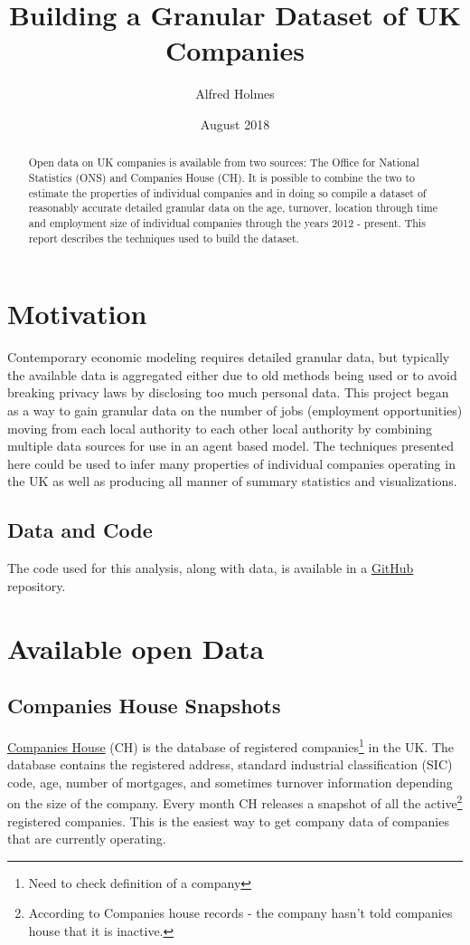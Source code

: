 \documentclass[a4paper,10pt]{article}
\title{Building a Granular Dataset of UK Companies}
\author{Alfred Holmes}
\date{August 2018}
\begin{document}
\maketitle

\begin{abstract}
    Open data on UK companies is available from two sources: The Office for National Statistics (ONS) and Companies House (CH). It is possible to combine the two to estimate the properties of individual companies and in doing so compile a dataset of reasonably accurate detailed granular data on the age, turnover, location through time and employment size of individual companies through the years 2012 - present. This report describes the techniques used to build the dataset.
\end{abstract}

\section*{Motivation}
Contemporary economic modeling requires detailed granular data, but typically the available data is aggregated either due to old methods being used or to avoid breaking privacy laws by disclosing too much personal data. This project began as a way to gain granular data on the number of jobs (employment opportunities) moving from each local authority to each other local authority by combining multiple data sources for use in an agent based model. The techniques presented here could be used to infer many properties of individual companies operating in the UK as well as producing all manner of summary statistics and visualizations.

\subsection*{Data and Code}
The code used for this analysis, along with data, is available in a \href{https://github.com/alfredholmes/abm_job_locations}{GitHub} repository. 


\section{Available open Data}
\subsection{Companies House Snapshots}
\href{https://www.gov.uk/government/organisations/companies-house}{Companies House} (CH) is the database of registered companies\footnote{Need to check definition of a company} in the UK. The database contains the registered address, standard industrial classification (SIC) code, age, number of mortgages, and sometimes turnover information depending on the size of the company. Every month CH releases a snapshot of all the active\footnote{According to Companies house records - the company hasn't told companies house that it is inactive.} registered companies. This is the easiest way to get company data of companies that are currently operating.
\end{document}
